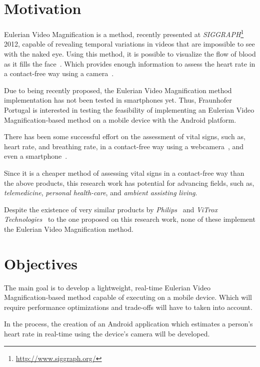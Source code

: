 \documentclass[9pt,a4paper]{extarticle}
\newcommand{\evm}{Eulerian Video Magnification}
\begin{document}
\begin{multicols}{2}

\section{Motivation}\label{sec:motivation}

\evm{} is a method, recently presented at
\emph{SIGGRAPH}\footnote{\url{http://www.siggraph.org/}} 2012, capable of
revealing temporal variations in videos that are impossible to see
with the naked eye. Using this method, it is possible to visualize
the flow of blood as it fills the face~\cite{Wu2012Eulerian}.
Which provides enough information to assess the heart rate in a
contact-free way using a camera~\cite{Wu2012Eulerian,
Poh2010Non, Poh2011Advancements}.

Due to being recently proposed, the \evm{} method implementation
has not been tested in smartphones yet. Thus, Fraunhofer Portugal is
interested in testing the feasibility of implementing an
\evm{}-based method on a mobile device with the Android platform.

There has been some successful effort on the assessment of vital
signs, such as, heart rate, and breathing rate, in a contact-free
way using a webcamera~\cite{Wu2012Eulerian, Poh2010Non, Poh2011Advancements},
and even a smartphone~\cite{Vitrox2013, Philips2013}.

Since it is a cheaper method of assessing vital signs in a
contact-free way than the above products, this research work has
potential for advancing fields, such as, \emph{telemedicine},
\emph{personal health-care}, and \emph{ambient assisting living}.

Despite the existence of very similar products by
\emph{Philips}~\cite{Philips2013} and
\emph{ViTrox Technologies}~\cite{Vitrox2013}
to the one proposed on this research work, none of these implement
the \evm{} method.

\section{Objectives}\label{sec:objectives}

The main goal is to develop a lightweight, real-time \evm{}-based
method capable of executing on a mobile device. Which will require
performance optimizations and trade-offs will have to taken into account.

In the process, the creation of an Android application which
estimates a person's heart rate in real-time using the device's camera
will be developed.


\end{multicols}
\end{document}
